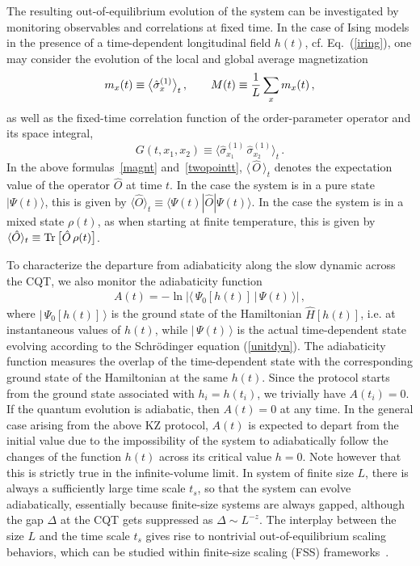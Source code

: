 The resulting out-of-equilibrium evolution of the system can be
investigated by monitoring observables and correlations at fixed time.
In the case of Ising models in the presence of a time-dependent
longitudinal field $h(t)$, cf. Eq.~(\ref{iring}), one may consider the
evolution of the local and global average magnetization
\begin{equation}
  m_x(t) \equiv \big\langle \hat \sigma_x^{(1)}
  \big\rangle_t \,, \qquad M(t) \equiv {1\over L} \sum_x m_x(t)\,,
  \label{magnt}
\end{equation}
as well as the fixed-time correlation function of the order-parameter
operator and its space integral,
\begin{equation}
  G(t,x_1,x_2) \equiv \big\langle \hat \sigma_{x_1}^{(1)}
  \, \hat \sigma_{x_2}^{(1)} \big\rangle_t\,.
  \label{twopointt}
  \end{equation}
In the above formulas~\eqref{magnt} and~\eqref{twopointt}, $\langle
\,\hat O \,\rangle_t$ denotes the expectation value of the operator
$\hat O$ at time $t$. In the case the system is in a pure state
$|\Psi(t)\rangle$, this is given by $\langle \hat O \rangle_t \equiv
\langle \Psi(t)| \hat O |\Psi(t) \rangle$.  In the case the system is
in a mixed state $\rho(t)$, as when starting at finite temperature,
this is given by $\langle \hat O \rangle_t \equiv {\rm Tr} \, \big[
  \hat O \, \rho(t) \big]$.

To characterize the departure from adiabaticity along the slow dynamic
across the CQT, we also monitor the adiabaticity function
\begin{eqnarray}
  A(t) = - \ln  |\langle \, \Psi_0[h(t)] \, | \, \Psi(t) \, \rangle|\,,
  \label{wtfunc}
\end{eqnarray}
where $|\,\Psi_0[h(t)]\,\rangle$ is the ground state of the
Hamiltonian $\hat H[h(t)]$, i.e. at instantaneous values of $h(t)$,
while $|\,\Psi(t)\,\rangle$ is the actual time-dependent state
evolving according to the Schr\"odinger equation (\ref{unitdyn}).  The
adiabaticity function measures the overlap of the time-dependent state
with the corresponding ground state of the Hamiltonian at the same
$h(t)$. Since the protocol starts from the ground state associated
with $h_i=h(t_i)$, we trivially have $A(t_i) = 0$.  If the quantum
evolution is adiabatic, then $A(t)=0$ at any time.  In the general
case arising from the above KZ protocol, $A(t)$ is expected to depart
from the initial value due to the impossibility of the system to
adiabatically follow the changes of the function $h(t)$ across its
critical value $h=0$.  Note however
that this is strictly true in the infinite-volume limit.  In system of
finite size $L$, there is always a sufficiently large time scale
$t_s$, so that the system can evolve adiabatically, essentially
because finite-size systems are always gapped, although the gap
$\Delta$ at the CQT gets suppressed as $\Delta \sim L^{-z}$. The
interplay between the size $L$ and the time scale $t_s$ gives rise to
nontrivial out-of-equilibrium scaling behaviors, which can be studied
within finite-size scaling (FSS) frameworks~\cite{RV-21,RV-20}.



